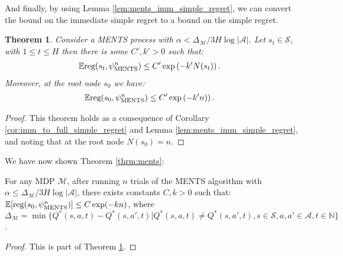 \documentclass{article}
\newcommand{\bb}[1]{\mathbb{#1}}
\newcommand{\cl}[1]{\mathcal{#1}}
\newcommand{\reg}{\textnormal{reg}}
\theoremstyle{plain}
\newtheorem{theorem}{Theorem}[section]
\begin{document}
\begin{appendices}
    
        And finally, by using Lemma \ref{lem:ments_imm_simple_regret}, we can convert the bound on the immediate simple regret to a bound on the simple regret.
        
        \begin{theorem} \label{thrm:ments_simple_regret_converge}
            Consider a MENTS process with $\alpha<\Delta_{\cl{M}}/3H\log |\cl{A}|$. Let $s_t\in\cl{S}$, with $1\leq t \leq H$ then there is some $C',k'>0$ such that:
            \begin{align}
                \bb{E} \reg(s_{t},\psi^n_{\textnormal{MENTS}}) &\leq C'\exp\left( -k' N(s_{t}) \right).
            \end{align}
            Moreover, at the root node $s_0$ we have:
            \begin{align}
                \bb{E} \reg(s_{0},\psi^n_{\textnormal{MENTS}}) &\leq C'\exp\left( -k'n) \right).
            \end{align}
        \end{theorem}
        \begin{proof}
            This theorem holds as a consequence of Corollary \ref{cor:imm_to_full_simple_regret} and Lemma \ref{lem:ments_imm_simple_regret}, and noting that at the root node $N(s_0)=n$.
        \end{proof}











        We have now shown Theorem \ref{thrm:ments}:
        \begin{customthm}{3.2} 
            For any MDP $\cl{M}$, after running $n$ trials of the MENTS algorithm with $\alpha \leq \Delta_{\cl{M}}/3H\log|\cl{A}|$, there exists constants $C,k>0$ such that: $\bb{E}[\reg(s_0,\psi^n_{\textnormal{MENTS}})] \leq C\exp(-kn)$, where $\Delta_{\cl{M}}=\min \{Q^*(s,a,t)-Q^*(s,a',t)\vert Q^*(s,a,t) \neq Q^*(s,a',t),s\in\cl{S}, a,a'\in\cl{A},t\in\bb{N}\}$.
        \end{customthm}
        \begin{proof}
            This is part of Theorem \ref{thrm:ments_simple_regret_converge}.
        \end{proof}








    


\end{appendices}
\end{document}
